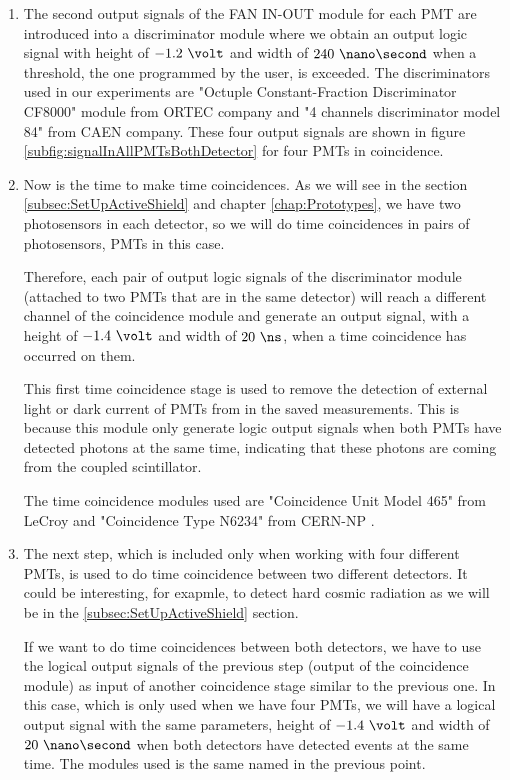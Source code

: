 \begin{itemize}
\begin{enumerate}
\item{} The second output signals of the FAN IN-OUT module for each PMT are introduced into a discriminator module where we obtain an output logic signal with height of $-1.2~\volt$ and width of $240~\nano\second$ when a threshold, the one programmed by the user, is exceeded. The discriminators used in our experiments are  "Octuple Constant-Fraction Discriminator CF8000" module from ORTEC company \cite{DataSheetDiscriminator} and "4 channels discriminator model 84" from CAEN company. These four output signals are shown in figure \ref{subfig:signalInAllPMTsBothDetector} for four PMTs in coincidence.

\item{} Now is the time to make time coincidences. As we will see in the section \ref{subsec:SetUpActiveShield} and chapter \ref{chap:Prototypes}, we have two photosensors in each detector, so we will do time coincidences in pairs of photosensors, PMTs in this case.

Therefore, each pair of output logic signals of the discriminator module (attached to two PMTs that are in the same detector) will reach a different channel of the coincidence module and generate an output signal, with a height of $-1.4~\volt$ and width of $20~\ns$, when a time coincidence has occurred on them.

This first time coincidence stage is used to remove the detection of  external light or dark current of PMTs from  in the saved measurements. This is because this module only generate logic output signals when both PMTs have detected photons at the same time, indicating that these photons are coming from the coupled scintillator.

The time coincidence modules used are "Coincidence Unit Model 465" from LeCroy \cite{DataSheetCoincidenceLeCroy} and "Coincidence Type N6234" from CERN-NP \cite{DataSheetCoincidenceCERN}.

\item{} The next step, which is included only when working with four different PMTs, is used to do time coincidence between two different detectors. It could be interesting, for exapmle, to detect hard cosmic radiation as we will be in the \ref{subsec:SetUpActiveShield} section.

If we want to do time coincidences between both detectors, we have to use the logical output signals of the previous step (output of the coincidence module) as input of another coincidence stage similar to the previous one. In this case, which is only used when we have four PMTs, we will have a logical output signal with the same parameters, height of $-1.4~\volt$ and width of $20~\nano\second$ when both detectors have detected events at the same time. The modules used is the same named in the previous point.


\end{enumerate}
\end{itemize}
